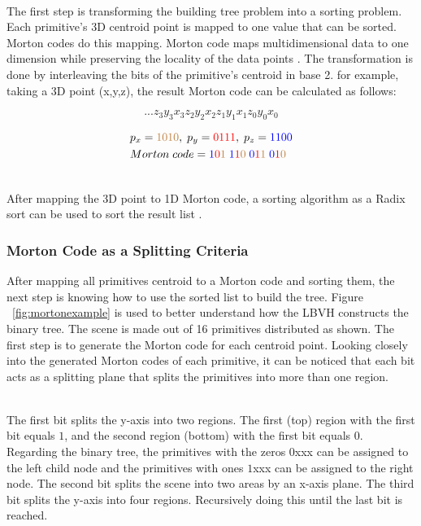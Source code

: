 \documentclass[11pt,a4paper]{article}
\begin{document}
\noindent
\\
The first step is transforming the building tree problem into a sorting problem. Each primitive's 3D centroid point is mapped to one value that can be sorted. Morton codes do this mapping. Morton code maps multidimensional data to one dimension while preserving the locality of the data points \protect\cite{wikipedia2022}. The transformation is done by interleaving the bits of the primitive's centroid in base 2. for example, taking a 3D point (x,y,z), the result Morton code can be calculated as follows: 

 
\begin{equation}
 ...z_3y_3x_3z_2y_2x_2z_1y_1x_1z_0y_0x_0
\end{equation}

\begin{align*}
& p_x = \textcolor{brown}{1010}, \;p_y = \textcolor{red}{0111}, \;p_z = \textcolor{blue}{1100} \\
&Morton\;code = \textcolor{blue}{1}\textcolor{red}{0}\textcolor{brown}{1} \;\textcolor{blue}{1}\textcolor{red}{1}\textcolor{brown}{0} \;\textcolor{blue}{0}\textcolor{red}{1}\textcolor{brown}{1} \;\textcolor{blue}{0}\textcolor{red}{1}\textcolor{brown}{0}
\end{align*}

\noindent
\\
After mapping the 3D point to 1D Morton code, a sorting algorithm as a Radix sort can be used to sort the result list \protect\cite{Karras2012}.

\subsubsection{Morton Code as a Splitting Criteria}
After mapping all primitives centroid to a Morton code and sorting them, the next step is knowing how to use the sorted list to build the tree. Figure ~\ref{fig:mortonexample} is used to better understand how the LBVH constructs the binary tree. The scene is made out of 16 primitives distributed as shown. The first step is to generate the Morton code for each centroid point. Looking closely into the generated Morton codes of each primitive, it can be noticed that each bit acts as a splitting plane that splits the primitives into more than one region. 

\noindent
\\
The first bit splits the y-axis into two regions. The first (top) region with the first bit equals $1$, and the second region (bottom) with the first bit equals $0$. Regarding the binary tree, the primitives with the zeros $0$xxx can be assigned to the left child node and the primitives with ones $1$xxx can be assigned to the right node. The second bit splits the scene into two areas by an x-axis plane. The third bit splits the y-axis into four regions. Recursively doing this until the last bit is reached.
\end{document}
